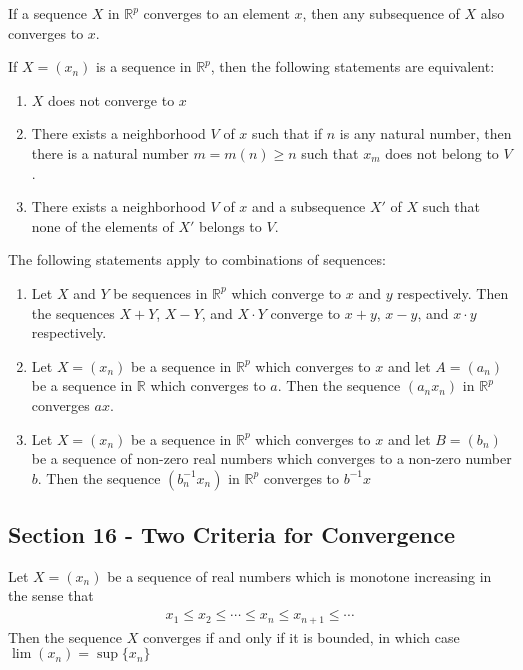 \documentclass[12pt]{article}
\newcommand{\R}{\mathbb{R}}
\newenvironment{theorem}[2][Theorem]{\begin{trivlist}
\item[\hskip \labelsep {\bfseries #1}\hskip \labelsep {\bfseries #2.}]}{\end{trivlist}}
\newenvironment{lemma}[2][Lemma]{\begin{trivlist}
\item[\hskip \labelsep {\bfseries #1}\hskip \labelsep {\bfseries #2.}]}{\end{trivlist}}
\begin{document}
\begin{lemma}{15.2}
If a sequence $X$ in $\R^p$ converges to an element $x$, then any subsequence of $X$ also converges to $x$.
\end{lemma}

\begin{theorem}{15.4}
If $X = (x_n)$ is a sequence in $\R^p$, then the following statements are equivalent:
\begin{enumerate}[label=\alph*)]
\item $X$ does not converge to $x$
\item There exists a neighborhood $V$ of $x$ such that if $n$ is any natural number, then there is a natural number $m = m(n) \geq n$ such that $x_m$ does not belong to $V$.
\item There exists a neighborhood $V$ of $x$ and a subsequence $X'$ of $X$ such that none of the elements of $X'$ belongs to $V$.
\end{enumerate}
\end{theorem}

\begin{theorem}{15.6}
The following statements apply to combinations of sequences:
\begin{enumerate}[label=\alph*)]
\item Let $X$ and $Y$ be sequences in $\R^p$ which converge to $x$ and $y$ respectively. Then the sequences $X + Y$, $X - Y$, and $X \cdot Y$ converge to $x + y$, $x - y$, and $x \cdot y$ respectively.
\item Let $X = (x_n)$ be a sequence in $\R^p$ which converges to $x$ and let $A = (a_n)$ be a sequence in $\R$ which converges to $a$. Then the sequence $(a_nx_n)$ in $\R^p$ converges $ax$.
\item Let $X = (x_n)$ be a sequence in $\R^p$ which converges to $x$ and let $B = (b_n)$ be a sequence of non-zero real numbers which converges to a non-zero number $b$. Then the sequence $(b_n^{-1} x_n)$ in $\R^p$ converges to $b^{-1} x$
\end{enumerate}
\end{theorem}

\subsection*{Section 16 - Two Criteria for Convergence}

\begin{theorem}[Monotone Convergence]{Theorem}
Let $X = (x_n)$ be a sequence of real numbers which is monotone increasing in the sense that
\begin{align*}
x_1 \leq x_2 \leq \cdots \leq x_n \leq x_{n+1} \leq \cdots
\end{align*}
Then the sequence $X$ converges if and only if it is bounded, in which case $\lim (x_n) = \sup\{x_n\}$
\end{theorem}
\end{document}

